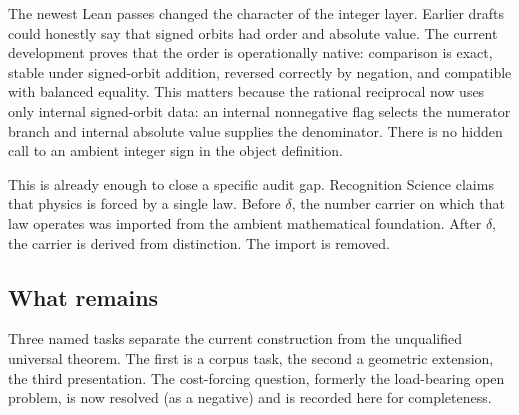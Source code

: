 \documentclass[11pt,a4paper]{article}
\theoremstyle{definition}
\theoremstyle{remark}
\begin{document}
The newest Lean passes changed the character of the integer layer. Earlier
drafts could honestly say that signed orbits had order and absolute value. The
current development proves that the order is operationally native: comparison
is exact, stable under signed-orbit addition, reversed correctly by negation,
and compatible with balanced equality. This matters because the rational
reciprocal now uses only internal signed-orbit data: an internal nonnegative
flag selects the numerator branch and internal absolute value supplies the
denominator. There is no hidden call to an ambient integer sign in the object
definition.

This is already enough to close a specific audit gap. Recognition Science
claims that physics is forced by a single law. Before $\delta$, the number
carrier on which that law operates was imported from the ambient mathematical
foundation. After $\delta$, the carrier is derived from distinction. The
import is removed.

\subsection{What remains}

Three named tasks separate the current construction from the unqualified
universal theorem. The first is a corpus task, the second a geometric
extension, the third presentation. The cost-forcing question, formerly the
load-bearing open problem, is now resolved (as a negative) and is recorded here
for completeness.
\end{document}
